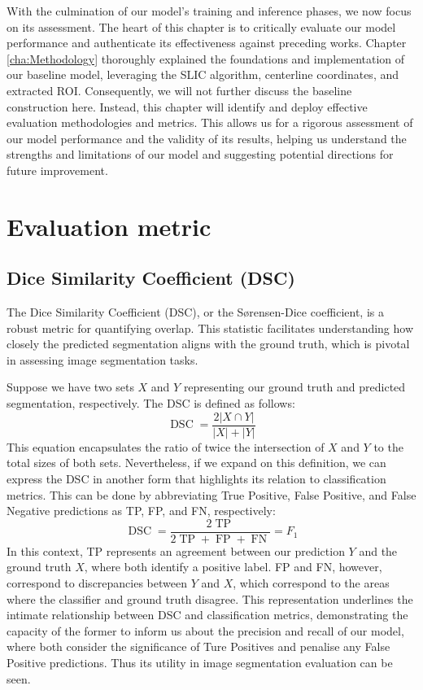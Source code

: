 With the culmination of our model's training and inference phases, we now focus on its assessment. The heart of this chapter is to critically evaluate our model performance and authenticate its effectiveness against preceding works. Chapter \ref{cha:Methodology} thoroughly explained the foundations and implementation of our baseline model, leveraging the SLIC algorithm, centerline coordinates, and extracted ROI. Consequently, we will not further discuss the baseline construction here. Instead, this chapter will identify and deploy effective evaluation methodologies and metrics. This allows us for a rigorous assessment of our model performance and the validity of its results, helping us understand the strengths and limitations of our model and suggesting potential directions for future improvement.

\section{Evaluation metric}
\subsection{Dice Similarity Coefficient (DSC)}

The Dice Similarity Coefficient (DSC), or the Sørensen-Dice coefficient, is a robust metric for quantifying overlap. This statistic facilitates understanding how closely the predicted segmentation aligns with the ground truth, which is pivotal in assessing image segmentation tasks.

Suppose we have two sets \(X\) and \(Y\) representing our ground truth and predicted segmentation, respectively. The DSC is defined as follows:
\[
\operatorname*{DSC} = \frac{2|X \cap Y|}{|X| + |Y|}
\]
This equation encapsulates the ratio of twice the intersection of \(X\) and \(Y\) to the total sizes of both sets. Nevertheless, if we expand on this definition, we can express the DSC in another form that highlights its relation to classification metrics. This can be done by abbreviating True Positive, False Positive, and False Negative predictions as TP, FP, and FN, respectively:
\[
\operatorname*{DSC} = \frac{2 \operatorname*{TP}}{2 \operatorname*{TP} + \operatorname*{FP} + \operatorname*{FN}} = F_{1}
\]
In this context, TP represents an agreement between our prediction \(Y\) and the ground truth \(X\), where both identify a positive label. FP and FN, however, correspond to discrepancies between \(Y\) and \(X\), which correspond to the areas where the classifier and ground truth disagree. This representation underlines the intimate relationship between DSC and classification metrics, demonstrating the capacity of the former to inform us about the precision and recall of our model, where both consider the significance of Ture Positives and penalise any False Positive predictions. Thus its utility in image segmentation evaluation can be seen.

